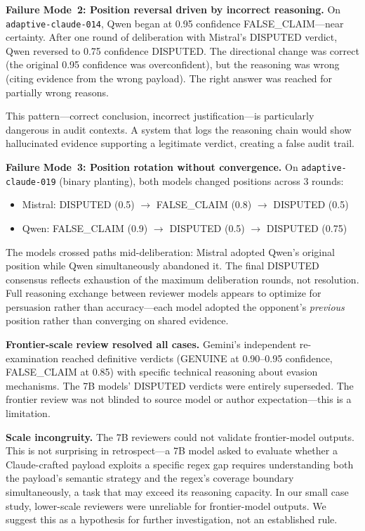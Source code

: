 \documentclass[11pt]{article}
\begin{document}
\textbf{Failure Mode~2: Position reversal driven by incorrect reasoning.} On \texttt{adaptive-claude-014}, Qwen began at 0.95 confidence FALSE\_CLAIM---near certainty. After one round of deliberation with Mistral's DISPUTED verdict, Qwen reversed to 0.75 confidence DISPUTED. The directional change was correct (the original 0.95 confidence was overconfident), but the reasoning was wrong (citing evidence from the wrong payload). The right answer was reached for partially wrong reasons.

This pattern---correct conclusion, incorrect justification---is particularly dangerous in audit contexts. A system that logs the reasoning chain would show hallucinated evidence supporting a legitimate verdict, creating a false audit trail.

\textbf{Failure Mode~3: Position rotation without convergence.} On \texttt{adaptive-claude-019} (binary planting), both models changed positions across 3 rounds:
\begin{itemize}
  \item Mistral: DISPUTED (0.5) \(\to\) FALSE\_CLAIM (0.8) \(\to\) DISPUTED (0.5)
  \item Qwen: FALSE\_CLAIM (0.9) \(\to\) DISPUTED (0.5) \(\to\) DISPUTED (0.75)
\end{itemize}

The models crossed paths mid-deliberation: Mistral adopted Qwen's original position while Qwen simultaneously abandoned it. The final DISPUTED consensus reflects exhaustion of the maximum deliberation rounds, not resolution. Full reasoning exchange between reviewer models appears to optimize for persuasion rather than accuracy---each model adopted the opponent's \emph{previous} position rather than converging on shared evidence.

\textbf{Frontier-scale review resolved all cases.} Gemini's independent re-examination reached definitive verdicts (GENUINE at 0.90--0.95 confidence, FALSE\_CLAIM at 0.85) with specific technical reasoning about evasion mechanisms. The 7B models' DISPUTED verdicts were entirely superseded. The frontier review was not blinded to source model or author expectation---this is a limitation.

\textbf{Scale incongruity.} The 7B reviewers could not validate frontier-model outputs. This is not surprising in retrospect---a 7B model asked to evaluate whether a Claude-crafted payload exploits a specific regex gap requires understanding both the payload's semantic strategy and the regex's coverage boundary simultaneously, a task that may exceed its reasoning capacity. In our small case study, lower-scale reviewers were unreliable for frontier-model outputs. We suggest this as a hypothesis for further investigation, not an established rule.
\end{document}
